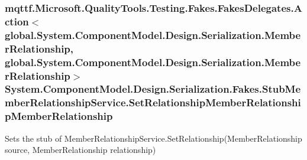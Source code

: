\hypertarget{class_system_1_1_component_model_1_1_design_1_1_serialization_1_1_fakes_1_1_stub_member_relationship_service_aae64dfb0d9c783ce701d3e70c1edaa51}{
\subsubsection[{Set\-Relationship\-Member\-Relationship\-Member\-Relationship}]{\setlength{\rightskip}{0pt plus 5cm}mqttf.\-Microsoft.\-Quality\-Tools.\-Testing.\-Fakes.\-Fakes\-Delegates.\-Action$<$global.\-System.\-Component\-Model.\-Design.\-Serialization.\-Member\-Relationship, global.\-System.\-Component\-Model.\-Design.\-Serialization.\-Member\-Relationship$>$ System.\-Component\-Model.\-Design.\-Serialization.\-Fakes.\-Stub\-Member\-Relationship\-Service.\-Set\-Relationship\-Member\-Relationship\-Member\-Relationship}}\label{class_system_1_1_component_model_1_1_design_1_1_serialization_1_1_fakes_1_1_stub_member_relationship_service_aae64dfb0d9c783ce701d3e70c1edaa51}


Sets the stub of Member\-Relationship\-Service.\-Set\-Relationship(\-Member\-Relationship source, Member\-Relationship relationship)

